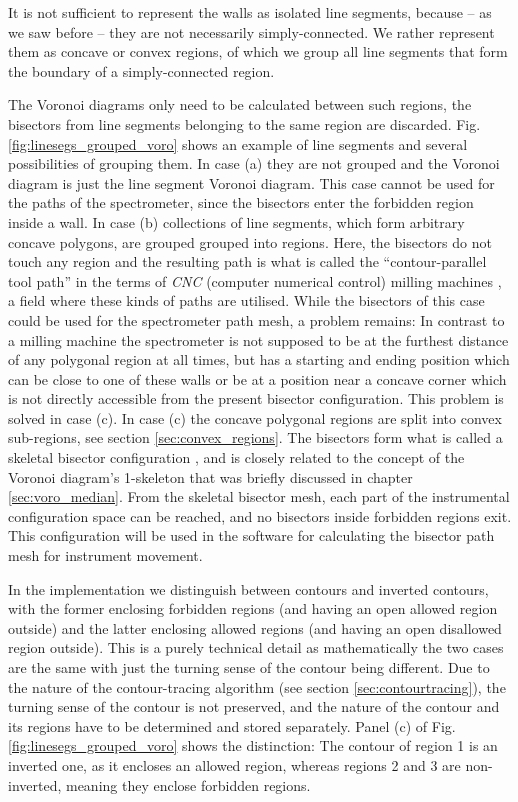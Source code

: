 It is not sufficient to represent the walls as isolated line segments, because -- 
as we saw before -- they are not necessarily simply-connected. 
We rather represent them as concave or convex regions, of which we group all 
line segments that form the boundary of a simply-connected region.

The Voronoi diagrams only need to be calculated between such regions, 
the bisectors from line segments belonging to the same region are discarded. 
Fig. \ref{fig:linesegs_grouped_voro} shows an example of line segments and several
possibilities of grouping them. 
In case (a) they are not grouped and the Voronoi diagram is just the line 
segment Voronoi diagram. This case cannot be used for the paths of the spectrometer,
since the bisectors enter the forbidden region inside a wall.
In case (b) collections of line segments, which form arbitrary concave polygons, 
are grouped grouped into regions. Here, the bisectors do not touch any region 
and the resulting path is what is called the ``contour-parallel tool path'' in 
the terms of \textit{CNC} (computer numerical control) milling machines \cite{Jeong1998, wiki_milling}, 
a field where these kinds of paths are utilised. While the bisectors of this case could 
be used for the spectrometer path mesh, a problem remains: In contrast to a milling
machine the spectrometer is not supposed to be at the furthest distance of any
polygonal region at all times, but has a starting and ending position which can 
be close to one of these walls or be at a position near a concave corner which
is not directly accessible from the present bisector configuration. This problem
is solved in case (c).
In case (c) the concave polygonal regions are split into convex sub-regions, see
section \ref{sec:convex_regions}.
The bisectors form what is called a skeletal bisector configuration \cite{Jeong1998, Couprie2007},
and is closely related to the concept of the Voronoi diagram's 1-skeleton 
\cite[p. 111]{Boissonnat2006} that was briefly discussed in chapter \ref{sec:voro_median}.
From the skeletal bisector mesh, each part of the instrumental configuration space 
can be reached, and no bisectors inside forbidden regions exit. 
This configuration will be used in the software for calculating the bisector 
path mesh for instrument movement.

In the implementation we distinguish between contours and inverted contours, with 
the former enclosing forbidden regions (and having an open allowed region outside) 
and the latter enclosing allowed regions (and having an open disallowed region outside).
This is a purely technical detail as mathematically the two cases are the same
with just the turning sense of the contour being different. 
Due to the nature of the contour-tracing algorithm (see section \ref{sec:contourtracing}), 
the turning sense of the contour is not preserved, and the nature of the contour 
and its regions have to be determined and stored separately.
Panel (c) of Fig. \ref{fig:linesegs_grouped_voro} shows the distinction: 
The contour of region 1 is an inverted one, as it encloses an allowed region,
whereas regions 2 and 3 are non-inverted, meaning they enclose forbidden regions.

